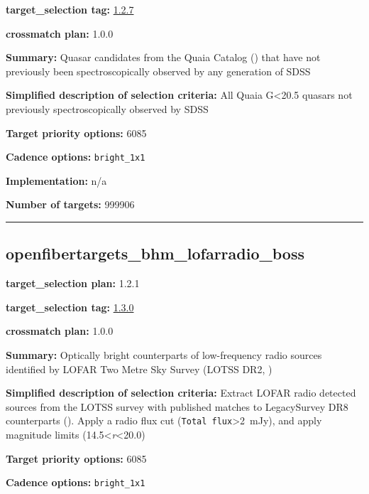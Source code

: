 \noindent\textbf{target\_selection tag:}
\href{https://github.com/sdss/target_selection/tree/1.2.7/}{1.2.7}

\noindent\textbf{crossmatch plan:} 1.0.0

\noindent\textbf{Summary:} Quasar candidates from the Quaia Catalog
(\citealt{StoreyFisher2024_Quaia}) that have not previously been spectroscopically observed
by any generation of SDSS

\noindent\textbf{Simplified description of selection criteria:} All Quaia
G\textless20.5 quasars not previously spectroscopically observed by SDSS


\noindent\textbf{Target priority options:} 6085

\noindent\textbf{Cadence options:} \texttt{bright\_1x1}

\noindent\textbf{Implementation:} n/a

\noindent\textbf{Number of targets:} 999906

\begin{center}\rule{0.5\linewidth}{0.5pt}\end{center}

\hypertarget{openfibertargets_bhm_lofarradio_boss_plan1.2.1}{%
\subsection{openfibertargets\_bhm\_lofarradio\_boss}\label{openfibertargets_bhm_lofarradio_boss_plan1.2.1}}

\noindent\textbf{target\_selection plan:} 1.2.1

\noindent\textbf{target\_selection tag:}
\href{https://github.com/sdss/target_selection/tree/1.3.0/}{1.3.0}

\noindent\textbf{crossmatch plan:} 1.0.0

\noindent\textbf{Summary:} Optically bright counterparts of low-frequency radio
sources identified by LOFAR Two Metre Sky Survey (LOTSS DR2,
\citealt{Hardcastle2023})

\noindent\textbf{Simplified description of selection criteria:} Extract LOFAR
radio detected sources from the LOTSS survey with published matches to
LegacySurvey DR8 counterparts
(\citealt{Hardcastle2023}). Apply a radio flux cut
(\texttt{Total\ flux}\textgreater2~mJy), and apply magnitude limits
(14.5\textless{}\emph{r}\textless20.0)


\noindent\textbf{Target priority options:} 6085

\noindent\textbf{Cadence options:} \texttt{bright\_1x1}

